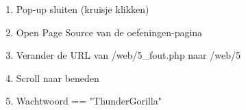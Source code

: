 \begin{enumerate}
  \item Pop-up sluiten (kruisje klikken)
  \item Open Page Source van de oefeningen-pagina
  \item Verander de URL van /web/5\_fout.php naar /web/5
  \item Scroll naar beneden
  \item Wachtwoord == "ThunderGorilla"
\end{enumerate}
